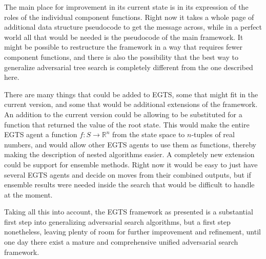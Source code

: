 The main place for improvement in its current state is in its expression of the roles of the individual component functions. Right now it takes a whole page of additional data structure pseudocode to get the message across, while in a perfect world all that would be needed is the pseudocode of the main framework. It might be possible to restructure the framework in a way that requires fewer component functions, and there is also the possibility that the best way to generalize adversarial tree search is completely different from the one described here.

There are many things that could be added to EGTS, some that might fit in the current version, and some that would be additional extensions of the framework. An addition to the current version could be allowing \gbm to be substituted for a  function that returned the value of the root state. This would make the entire EGTS agent a function $f:S \to \mathbb{R}^n$ from the state space to $n$-tuples of real numbers, and would allow other EGTS agents to use them as \eval functions, thereby making the description of nested algorithms easier. A completely new extension could be support for ensemble methods. Right now it would be easy to just have several EGTS agents and decide on moves from their combined outputs, but if ensemble results were needed inside the search that would be difficult to handle at the moment.

Taking all this into account, the EGTS framework as presented is a substantial first step into generalizing adversarial search algorithms, but a first step nonetheless, leaving plenty of room for further improvement and refinement, until one day there exist a mature and comprehensive unified adversarial search framework.